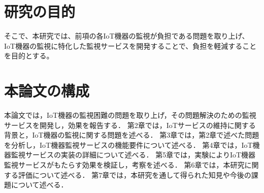 \section{研究の目的}%
そこで、本研究では、前項の各IoT機器の監視が負担である問題を取り上げ、IoT機器の監視に特化した監視サービスを開発することで、負担を軽減することを目的とする。
\begin{comment}
そこで、前述の課題を解決するために、新規に監視サービスを開発し、IoT機器から通知を送ることにより、IoT機器の監視における困難を軽減することを目的とする。
IoT機器が自身の過去の動作状態や通信状態を記録することで，設置されるネットワークに関係なく状態監視をすることを可能にする．
また，サービスを機器監視に特化させ独立させることで，IoTサービスに変更を与えること無く，機器を監視することを可能にする．
この仕組みを用いることで，IoT機器が設置されるネットワークに関係無く状態を監視することや，IoT機器監視の設定の簡略化や、IoTサービスに組み込む負担の軽減を行う。
本研究では，IoT機器からの通知による機器の設置環境によらない機器の監視を行うことにより，IoTサービスの維持を容易にするシステムの開発に取り組む．
\end{comment}

\section{本論文の構成}%
本論文では，IoT機器の監視困難の問題を取り上げ，その問題解決のための監視サービスを開発し，効果を報告する．
第2章では，IoTサービスの維持に関する背景と，IoT機器の監視に関する問題を述べる．
第3章では，第2章で述べた問題を分析し，IoT機器監視サービスの機能要件について述べる．
第4章では，IoT機器監視サービスの実装の詳細について述べる．
第5章では，実験によりIoT機器監視サービスがもたらす効果を検証し，考察を述べる．
第6章では，本研究に関する評価について述べる．
第7章では，本研究を通して得られた知見や今後の課題について述べる．


